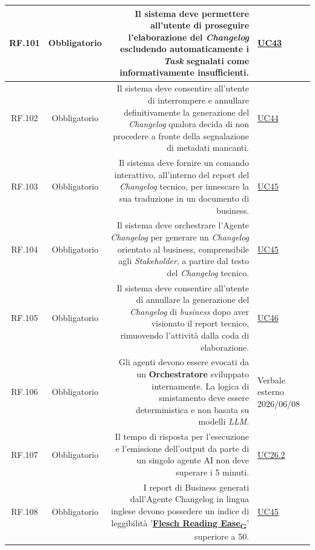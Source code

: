 \documentclass[12pt, a4paper]{article}
\newcommand{\urlglossario}{https://skynetunigroup.github.io/Code_Guardian/Documentazione/PB/glossario_v2.0.0.pdf} %
\newcommand{\glo}[2]{\href{\urlglossario\#nameddest=#2}{#1\textsubscript{G}}}
\begin{document}
\begin{xltabular}{\textwidth}{|c|c|D|F|}
    RF.101 & Obbligatorio & Il sistema deve permettere all'utente di proseguire l'elaborazione del \textit{Changelog} escludendo automaticamente i \textit{Task} segnalati come informativamente insufficienti. & \hyperref[uc:43]{UC43} \\ \hline
    
    RF.102 & Obbligatorio & Il sistema deve consentire all'utente di interrompere e annullare definitivamente la generazione del \textit{Changelog} qualora decida di non procedere a fronte della segnalazione di metadati mancanti. & \hyperref[uc:44]{UC44} \\ \hline
    
    RF.103 & Obbligatorio & Il sistema deve fornire un comando interattivo, all'interno del report del \textit{Changelog} tecnico, per innescare la sua traduzione in un documento di business. & \hyperref[uc:45]{UC45} \\ \hline
    
    RF.104 & Obbligatorio & Il sistema deve orchestrare l'Agente \textit{Changelog} per generare un \textit{Changelog} orientato al business, comprensibile agli \textit{Stakeholder}, a partire dal testo del \textit{Changelog} tecnico. & \hyperref[uc:45]{UC45} \\ \hline
    
    RF.105 & Obbligatorio & Il sistema deve consentire all'utente di annullare la generazione del \textit{Changelog} di \textit{business} dopo aver visionato il report tecnico, rimuovendo l'attività dalla coda di elaborazione. & \hyperref[uc:46]{UC46} \\ \hline

    RF.106 & Obbligatorio & Gli agenti devono essere evocati da un \textbf{Orchestratore} sviluppato internamente. La logica di smistamento deve essere deterministica e non basata su modelli \textit{LLM}. & Verbale esterno 2026/06/08 \\ \hline

    RF.107 & Obbligatorio & Il tempo di risposta per l'esecuzione e l'emissione dell'output da parte di un singolo agente AI non deve superare i 5 minuti. & \hyperref[uc:26.2]{UC26.2} \\ \hline

    RF.108 & Obbligatorio & I report di Business generati dall'Agente Changelog in lingua inglese devono possedere un indice di leggibilità '\textbf{\glo{Flesch Reading Ease}{flesch-reading-ease}}' superiore a 50. & \hyperref[uc:45]{UC45} \\ \hline


\end{xltabular}
\end{document}
